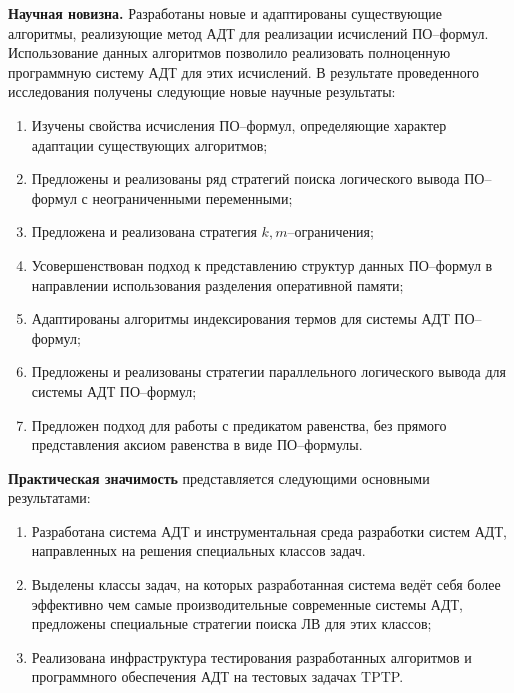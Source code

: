 \documentclass[a4paper]{report}
\begin{document}


\textbf{Научная новизна.} Разработаны новые и адаптированы существующие алгоритмы, реализующие метод АДТ для реализации исчислений ПО--формул. Использование данных алгоритмов позволило реализовать полноценную программную систему АДТ для этих исчислений. В результате проведенного исследования получены следующие новые научные результаты:
\begin{enumerate}
\item Изучены свойства исчисления ПО--формул, определяющие характер адаптации существующих алгоритмов;
\item Предложены и реализованы ряд стратегий поиска логического вывода ПО--формул с неограниченными переменными;
\item Предложена и реализована стратегия $k,m$--ограничения;
\item Усовершенствован подход к представлению структур данных ПО--формул в направлении использования разделения оперативной памяти;
\item Адаптированы алгоритмы индексирования термов для системы АДТ ПО--формул;
\item Предложены и реализованы стратегии параллельного логического вывода для системы АДТ ПО--формул;
\item Предложен подход для работы с предикатом равенства, без прямого представления аксиом равенства в виде ПО--формулы.
\end{enumerate}


\textbf{Практическая значимость} представляется следующими основными результатами:
\begin{enumerate}
\item Разработана система АДТ и инструментальная среда разработки систем АДТ, направленных на решения специальных классов задач.
\item Выделены классы задач, на которых разработанная система ведёт себя более эффективно чем самые производительные современные системы АДТ, предложены специальные стратегии поиска ЛВ для этих классов;
\item Реализована инфраструктура тестирования разработанных алгоритмов и программного обеспечения АДТ на тестовых задачах TPTP.
\end{enumerate}
\end{document}
